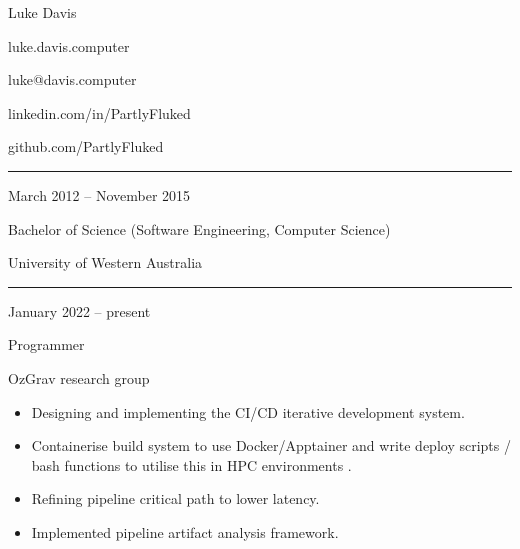 \documentclass[a4paper,10pt]{article}
\newlength{\cvcolumngapwidth}
\newlength{\cvleftcolumnwidth}
\newlength{\cvrightcolumnwidth}
\newcommand{\cvnamestyle}[1]{{\Large\cvnamefont\textcolor{cvnamecolor}{#1}}}
\newcommand{\cvsectionstyle}[1]{{\normalsize\cvsectionfont\textcolor{cvsectioncolor}{#1}}}
\newcommand{\cvtitlestyle}[1]{{\large\cvtitlefont\textcolor{cvtitlecolor}{#1}}}
\newcommand{\cvdurationstyle}[1]{{\small\cvdurationfont\textcolor{cvdurationcolor}{#1}}}
\newlength{\cvafteritemskipamount}
\newlength{\cvaftersectionskipamount}
\newlength{\cvafternameskipamount}
\newlength{\cvafterpersonalinfolineskipamount}
\newlength{\cvaftertitleskipamount}
\newlength{\cvparskip}
\newcommand{\cvpersonalinfo}[2]{
    \begin{minipage}[t]{\cvleftcolumnwidth}
        \vspace{0mm} %
        \raggedleft #1
    \end{minipage}%
    \hspace{\cvcolumngapwidth}%
    \begin{minipage}[t]{\cvrightcolumnwidth}
        \vspace{0mm} %
        #2
    \end{minipage}

    \vspace{\cvafteritemskipamount}
}
\newcommand{\cvname}[1]{
    \cvnamestyle{#1}

    \vspace{\cvafternameskipamount}
}
\newcommand{\cvpersonalinfolinewithicon}[3]{
    \raisebox{.5\fontcharht\font`E-.5\height}{\texttt{[image: \#2]}}
    #3

    \vspace{\cvafterpersonalinfolineskipamount}
}
\newcommand{\cvsection}[1]{
    \begin{minipage}[t]{\cvleftcolumnwidth}
        \raggedleft\cvsectionstyle{#1}
    \end{minipage}%
    \hspace{\cvcolumngapwidth}%
    \begin{minipage}[t]{\cvrightcolumnwidth}
        \textcolor{cvrulecolor}{\rule{\cvrightcolumnwidth}{0.3mm}}
    \end{minipage}

    \vspace{\cvaftersectionskipamount}
}
\newcommand{\cvitem}[2]{
    \begin{minipage}[t]{\cvleftcolumnwidth}
        \raggedleft #1
    \end{minipage}%
    \hspace{\cvcolumngapwidth}%
    \begin{minipage}[t]{\cvrightcolumnwidth}
        \setlength{\parskip}{\cvparskip} #2
    \end{minipage}

    \vspace{\cvafteritemskipamount}
}
\newcommand{\cvtitle}[1]{
    \cvtitlestyle{#1}

    \vspace{\cvaftertitleskipamount}
    \vspace{-\cvparskip}
}
\begin{document}

\cvpersonalinfo{
    \cvname{Luke Davis}


    \cvpersonalinfolinewithicon{height=5mm}{website-icon.png}{
        luke.davis.computer
    }

    \cvpersonalinfolinewithicon{height=5mm}{070-envelop.pdf}{
        luke@davis.computer
    }
}{
    
    \vspace{7.6mm plus 1.25mm minus 1.25mm}

    \cvpersonalinfolinewithicon{height=5mm}{458-linkedin.pdf}{
        linkedin.com/in/PartlyFluked
    }
    
    \cvpersonalinfolinewithicon{height=5mm}{GitHub-Mark-32px.png}{
        github.com/PartlyFluked
    }
}


\cvsection{EDUCATION}

\cvitem{
    \cvdurationstyle{March 2012 -- November 2015}
}{
    \cvtitle{Bachelor of Science (Software Engineering, Computer Science)}

    University of Western Australia
}


\cvsection{WORK EXPERIENCE}

\cvitem{
    \cvdurationstyle{January 2022 -- present}
}{
    \cvtitle{Programmer}

    OzGrav research group

    \begin{itemize}[leftmargin=*]
        \item Designing and implementing the CI/CD iterative development system.
        \item Containerise build system to use Docker/Apptainer and write deploy scripts / bash functions to utilise this in HPC environments .
        \item Refining pipeline critical path to lower latency.
        \item Implemented pipeline artifact analysis framework.
    \end{itemize}
}
\end{document}
